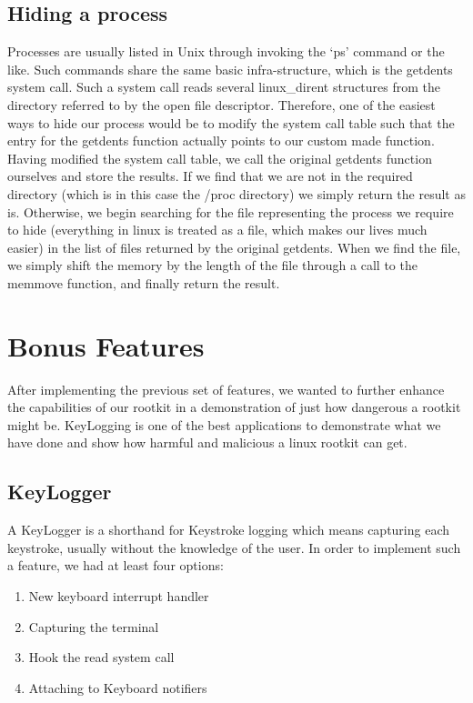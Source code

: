 \documentclass{article}
\begin{document}
\subsection{Hiding a process}
    
    Processes are usually listed in Unix through invoking the `ps' command or the like. Such commands share the same basic infra-structure, which is the getdents system call. Such a system call reads several linux\_dirent structures from the directory referred to by the open file descriptor. Therefore, one of the easiest ways to hide our process would be to modify the system call table such that the entry for the getdents function actually points to our custom made function. Having modified the system call table, we call the original getdents function ourselves and store the results. If we find that we are not in the required directory (which is in this case the /proc directory) we simply return the result as is. Otherwise, we begin searching for the file representing the process we require to hide (everything in linux is treated as a file, which makes our lives much easier) in the list of files returned by the original getdents. When we find the file, we simply shift the memory by the length of the file through a call to the memmove function, and finally return the result.

\clearpage
\section{Bonus Features}

After implementing the previous set of features, we wanted to further enhance the capabilities of our rootkit in a demonstration of just how dangerous a rootkit might be. KeyLogging is one of the best applications to demonstrate what we have done and show how harmful and malicious a linux rootkit can get. 

\subsection{KeyLogger}
A KeyLogger is a shorthand for Keystroke logging which means capturing each keystroke, usually without the knowledge of the user.
In order to implement such a feature, we had at least four options:
\begin{enumerate}
\item New keyboard interrupt handler
\item Capturing the terminal
\item Hook the read system call
\item Attaching to Keyboard notifiers
\end{enumerate}
\end{document}
